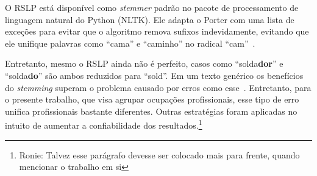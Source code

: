 \documentclass[12pt,a4paper]{article}
\begin{document}
O RSLP está disponível como \textit{stemmer} padrão no pacote de processamento de linguagem natural do Python (NLTK). Ele adapta o Porter com uma lista de exceções para evitar que o algoritmo remova sufixos indevidamente, evitando que ele unifique palavras como \enquote{cama} e \enquote{caminho} no radical \enquote{cam}~\cite{Orengo2001-yw}.

Entretanto, mesmo o RSLP ainda não é perfeito, casos como \enquote{solda\textbf{dor}} e \enquote{solda\textbf{do}} são ambos reduzidos para \enquote{sold}. Em um texto genérico os benefícios do \textit{stemming} superam o problema causado por erros como esse~\cite{Hollink2004-hh}. Entretanto, para o presente trabalho, que visa agrupar ocupações profissionais, esse tipo de erro unifica profissionais bastante diferentes. Outras estratégias foram aplicadas no intuito de aumentar a confiabilidade dos resultados.\footnote{Ronie: Talvez esse parágrafo devesse ser colocado mais para frente, quando mencionar o trabalho em si}

\def\refname{REFERÊNCIAS BIBLIOGRÁFICAS}


\end{document}
